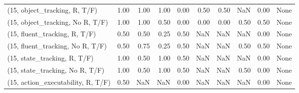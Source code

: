 \begin{table*}[h!]
\begin{adjustbox}{width=2\columnwidth,center}
\begin{tabular}{lrrr|rrr|rrr}
\midrule
(15, object\_tracking, R, T/F)         &                      1.00 &                  1.00 &                      1.00 &                          0.00 &                      0.50 &                          0.50 &                                    NaN &                               0.00 &                                  None \\
(15, object\_tracking, No R, T/F)      &                      1.00 &                  1.00 &                      0.50 &                          0.00 &                      0.00 &                          0.00 &                                   0.50 &                               0.50 &                                  None \\
(15, fluent\_tracking, R, T/F)         &                      0.50 &                  0.50 &                      0.25 &                          0.50 &                       NaN &                           NaN &                                    NaN &                               0.00 &                                  None \\
(15, fluent\_tracking, No R, T/F)      &                      0.50 &                  0.75 &                      0.25 &                          0.50 &                       NaN &                           NaN &                                   0.50 &                               0.50 &                                  None \\
(15, state\_tracking, R, T/F)          &                      1.00 &                  0.50 &                      1.00 &                          0.50 &                       NaN &                           NaN &                                    NaN &                               0.00 &                                  None \\
(15, state\_tracking, No R, T/F)       &                      1.00 &                  0.50 &                      1.00 &                          0.50 &                       NaN &                           NaN &                                   0.50 &                               0.00 &                                  None \\
(15, action\_executability, R, T/F)    &                      0.50 &                   NaN &                       NaN &                          0.00 &                       NaN &                           NaN &                                    NaN &                               0.00 &                                  None \\

\end{tabular}
\end{adjustbox}
\end{table*}
